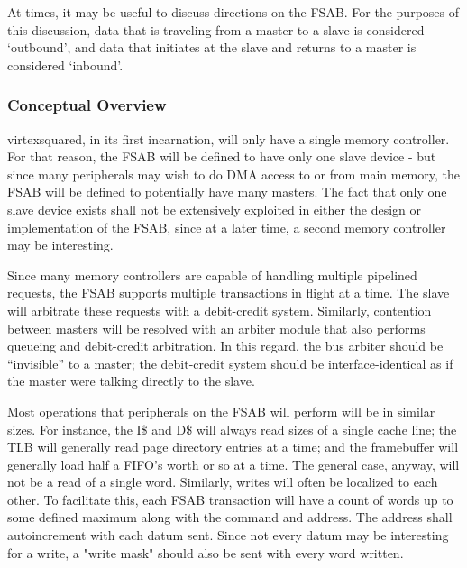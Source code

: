\documentclass[10pt,twocolumn]{article}
\begin{document}
At times, it may be useful to discuss directions on the FSAB. For the
purposes of this discussion, data that is traveling from a master to a slave
is considered `outbound', and data that initiates at the slave and returns
to a master is considered `inbound'.

\subsubsection{Conceptual Overview}

virtexsquared, in its first incarnation, will only have a single memory
controller. For that reason, the FSAB will be defined to have only one slave
device - but since many peripherals may wish to do DMA access to or from
main memory, the FSAB will be defined to potentially have many masters. The
fact that only one slave device exists shall not be extensively exploited in
either the design or implementation of the FSAB, since at a later time, a
second memory controller may be interesting.

Since many memory controllers are capable of handling multiple pipelined
requests, the FSAB supports multiple transactions in flight at a time.  The
slave will arbitrate these requests with a debit-credit system.  Similarly,
contention between masters will be resolved with an arbiter module that also
performs queueing and debit-credit arbitration.  In this regard, the bus
arbiter should be ``invisible'' to a master; the debit-credit system should
be interface-identical as if the master were talking directly to the slave.

Most operations that peripherals on the FSAB will perform will be in similar
sizes.  For instance, the I\$ and D\$ will always read sizes of a single
cache line; the TLB will generally read page directory entries at a time;
and the framebuffer will generally load half a FIFO's worth or so at a time. 
The general case, anyway, will not be a read of a single word.  Similarly,
writes will often be localized to each other.  To facilitate this, each FSAB
transaction will have a count of words up to some defined maximum along with
the command and address.  The address shall autoincrement with each datum
sent.  Since not every datum may be interesting for a write, a "write mask"
should also be sent with every word written.
\end{document}
